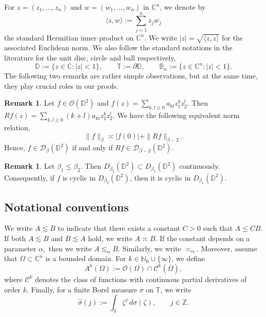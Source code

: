 \documentclass[a4paper,12pt]{amsart}
\theoremstyle{definition}
\newtheorem{rem}[thm]{Remark}
\def\D{\mathbb D}
\begin{document}
    	For $z=(z_1,\dots,z_n)$ and $w=(w_1,\dots,w_n)$ in
$\mathbb C^n$, we denote by
\[
    \langle z,w\rangle
    :=\sum_{j=1}^n z_j\overline{w_j}
\]
the standard Hermitian inner product on $\mathbb C^n$. We write
$
    |z|=\sqrt{\langle z,z\rangle}
$
for the associated Euclidean norm. We also follow the standard notations in the literature for the unit disc, circle and ball respectively,
    $$\mathbb D:=\{z\in\mathbb C:|z|<1\},
    \qquad
    \mathbb T:=\partial\mathbb D,
    \qquad
    \mathbb B_n:=\{z\in\mathbb C^n:|z|<1\}.$$
The following two remarks are rather simple observations, but at the same time, they play crucial roles in our proofs.
\begin{rem}\label{rem:radial-derivative}
    Let $f \in \mathcal{O}(\D^2)$ and
    $f(z)= \sum_{k,l \geq 0} a_{kl} z_1^k z_2^l$. Then
    $Rf(z) = \sum_{k,l \geq0} (k+l) a_{kl} z_1^k z_2^l$. We have the following equivalent norm relation,
    \begin{equation}
        \|f\|_\beta
        \asymp |f(0)|+\|Rf\|_{\beta-2}.
        \label{eq:radial-norm-equivalence}
    \end{equation}
    Hence, $f \in \mathcal D_\beta(\D^2)$ if and only if
    $Rf \in \mathcal D_{\beta-2}(\D^2)$.
\end{rem}

\begin{rem}\label{rem:monotonicity}
Let $\beta_1\leq\beta_2$. Then $D_{\beta_2}(\mathbb D^2)\subset D_{\beta_1}(\mathbb D^2)$ continuously. Consequently, if $f$ is cyclic in $D_{\beta_2}(\mathbb D^2)$, then it is cyclic in $D_{\beta_1}(\mathbb D^2)$.
\end{rem}

\subsection{Notational conventions}
    We write $A \lesssim B$ to indicate that there exists a constant $C > 0$ such that $A \leq C B$. If both $A \lesssim B$ and $B \lesssim A$ hold, we write $A \asymp B$. If the constant depends on a parameter $\alpha,$ then we write $A \lesssim_{\alpha}B.$ Similarly, we write $\asymp_{\alpha}.$ Moreover, assume that $\Omega\subset\mathbb C^n$ is a bounded domain. For $k\in\mathbb N_0\cup\{\infty\}$, we define
\[
    A^k(\Omega):=\mathcal O(\Omega)\cap \mathcal{C}^k(\overline\Omega),
\]
where $\mathcal{C}^k$ denotes the class of functions with continuous partial derivatives of order $k$.
Finally, for a finite Borel measure $\sigma$ on $\mathbb T$, we write
\[
    \widehat\sigma(j):=\int_{\mathbb T}\zeta^j\,d\sigma(\zeta),
    \qquad j\in\mathbb Z.
\]
\end{document}
